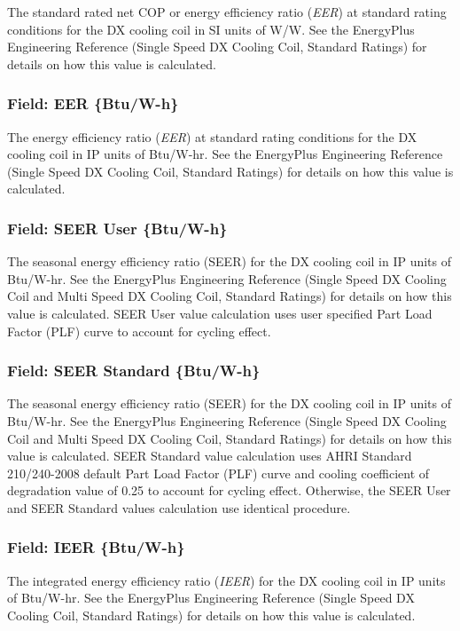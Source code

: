 The standard rated net COP or energy efficiency ratio (\emph{EER}) at standard rating conditions for the DX cooling coil in SI units of W/W. See the EnergyPlus Engineering Reference (Single Speed DX Cooling Coil, Standard Ratings) for details on how this value is calculated.

\subsubsection{Field: EER \{Btu/W-h\}}

The energy efficiency ratio (\emph{EER}) at standard rating conditions for the DX cooling coil in IP units of Btu/W-hr. See the EnergyPlus Engineering Reference (Single Speed DX Cooling Coil, Standard Ratings) for details on how this value is calculated.

\subsubsection{Field: SEER User \{Btu/W-h\}}

The seasonal energy efficiency ratio (SEER) for the DX cooling coil in IP units of Btu/W-hr. See the EnergyPlus Engineering Reference (Single Speed DX Cooling Coil and Multi Speed DX Cooling Coil, Standard Ratings) for details on how this value is calculated. SEER User value calculation uses user specified Part Load Factor (PLF) curve to account for cycling effect.

\subsubsection{Field: SEER Standard \{Btu/W-h\}}

The seasonal energy efficiency ratio (SEER) for the DX cooling coil in IP units of Btu/W-hr. See the EnergyPlus Engineering Reference (Single Speed DX Cooling Coil and Multi Speed DX Cooling Coil, Standard Ratings) for details on how this value is calculated. SEER Standard value calculation uses AHRI Standard 210/240-2008 default Part Load Factor (PLF) curve and cooling coefficient of degradation value of 0.25 to account for cycling effect. Otherwise, the SEER User and SEER Standard values calculation use identical procedure.

\subsubsection{Field: IEER \{Btu/W-h\}}

The integrated energy efficiency ratio (\emph{IEER}) for the DX cooling coil in IP units of Btu/W-hr. See the EnergyPlus Engineering Reference (Single Speed DX Cooling Coil, Standard Ratings) for details on how this value is calculated.


